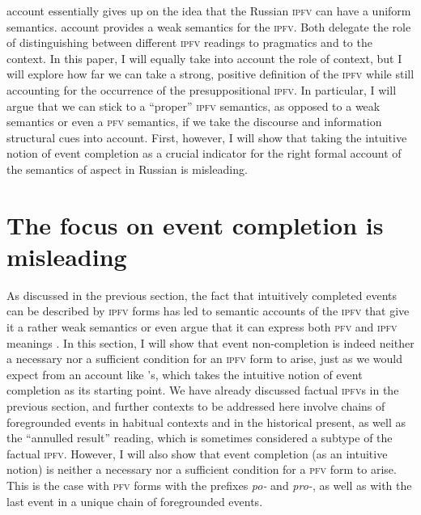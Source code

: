 \documentclass[output=paper]{langscibook}
\begin{document}
 account essentially gives up on the idea that the Russian \textsc{ipfv} can have a uniform semantics.  account provides a weak semantics for the \textsc{ipfv}. Both delegate the role of distinguishing between different \textsc{ipfv} readings to pragmatics and to the context. In this paper, I will equally take into account the role of context, but I will explore how far we can take a strong, positive definition of the \textsc{ipfv} while still accounting for the occurrence of the presuppositional \textsc{ipfv}. In particular, I will argue that we can stick to a ``proper'' \textsc{ipfv} semantics, as opposed to a weak semantics or even a \textsc{pfv} semantics, if we take the discourse and information structural cues into account. First, however, I will show that taking the intuitive notion of event completion as a crucial indicator for the right formal account of the semantics of aspect in Russian is misleading.  

\section{The focus on event completion is misleading}
\label{gehr:sec:eventcompl}

As discussed in the previous section, the fact that intuitively completed events can be described by \textsc{ipfv} forms has led to semantic accounts of the \textsc{ipfv} that give it a rather weak semantics \citep[][]{gronndiss,altshuler14} or even argue that it can express both \textsc{pfv} and \textsc{ipfv} meanings \citep[][]{gronn15}. In this section, I will show that event non-completion is indeed neither a necessary nor a sufficient condition for an \textsc{ipfv} form to arise, just as we would expect from an account like \citeauthor{gronn15}'s, which takes the intuitive notion of event completion as its star\-ting point. We have already discussed factual \textsc{ipfv}s in the previous section, and further contexts to be addressed here involve chains of foregrounded events in habitual contexts and in the historical present, as well as the ``annulled result'' reading, which is sometimes considered a subtype of the factual \textsc{ipfv}. However, I will also show that event completion (as an intuitive notion) is neither a necessary nor a sufficient condition for a \textsc{pfv} form to arise. This is the case with \textsc{pfv} forms with the prefixes \textit{po-} and \textit{pro-}, as well as with the last event in a unique chain of foregrounded events. 
\end{document}
